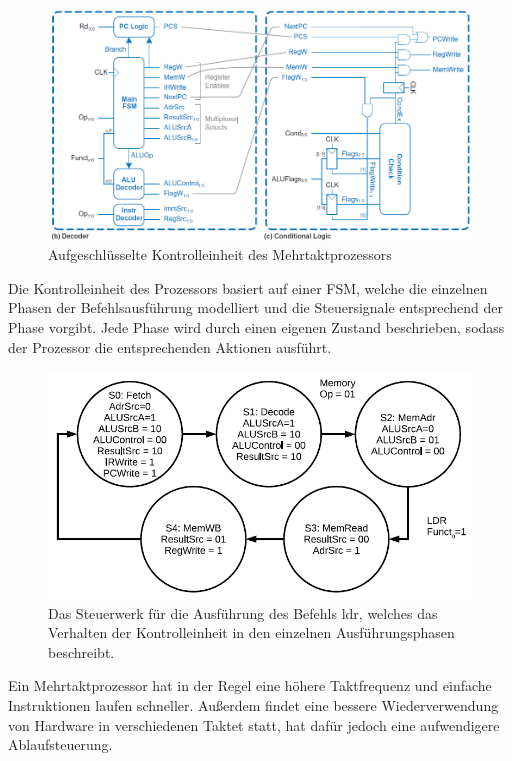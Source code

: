 \documentclass[a4paper,12pt,leqno]{article}
\begin{document}
\begin{figure}[h!]
\centering
\includegraphics[scale=0.6]{Grafiken/Mehrtakt-Kontrolleinheit.png}
\caption{Aufgeschlüsselte Kontrolleinheit des Mehrtaktprozessors}
\label{fig:kontrolleinheit}
\end{figure}

Die Kontrolleinheit des Prozessors basiert auf einer FSM, welche die einzelnen Phasen der Befehlsausführung modelliert und die Steuersignale entsprechend der Phase vorgibt. Jede Phase wird durch einen eigenen Zustand beschrieben, sodass der Prozessor die entsprechenden Aktionen ausführt.\\
\begin{figure}
\centering
\includegraphics[scale=0.5]{Grafiken/Mehrtakt-Steuerwerk.png}
\caption{Das Steuerwerk für die Ausführung des Befehls ldr, welches das Verhalten der Kontrolleinheit in den einzelnen Ausführungsphasen beschreibt.}
\end{figure}

Ein Mehrtaktprozessor hat in der Regel eine höhere Taktfrequenz und einfache Instruktionen laufen schneller. Außerdem findet eine bessere Wiederverwendung von Hardware in verschiedenen Taktet statt, hat dafür jedoch eine aufwendigere Ablaufsteuerung.\\
\end{document}
